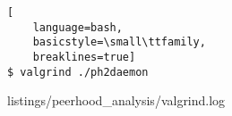 \ApplyOnePageAppendixPageStyle{}

\begin{lstlisting}[
	language=bash,
	basicstyle=\small\ttfamily,
	breaklines=true]
$ valgrind ./ph2daemon
\end{lstlisting}


	{listings/peerhood_analysis/valgrind.log}